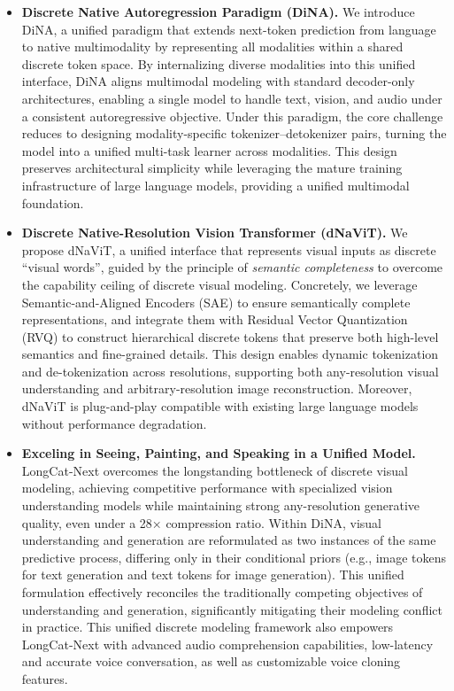 \documentclass{article}
\begin{document}
\begin{itemize}
\item 
\textbf{Discrete Native Autoregression Paradigm (DiNA).} 
We introduce DiNA, a unified paradigm that extends next-token prediction from language to native multimodality by representing all modalities within a shared discrete token space. By internalizing diverse modalities into this unified interface, DiNA aligns multimodal modeling with standard decoder-only architectures, enabling a single model to handle text, vision, and audio under a consistent autoregressive objective. Under this paradigm, the core challenge reduces to designing modality-specific tokenizer–detokenizer pairs, turning the model into a unified multi-task learner across modalities. This design preserves architectural simplicity while leveraging the mature training infrastructure of large language models, providing a unified multimodal foundation.
\item
\textbf{Discrete Native-Resolution Vision Transformer (dNaViT).} 
We propose dNaViT, a unified interface that represents visual inputs as discrete ``visual words'', guided by the principle of \emph{semantic completeness} to overcome the capability ceiling of discrete visual modeling. Concretely, we leverage Semantic-and-Aligned Encoders (SAE) to ensure semantically complete representations, and integrate them with Residual Vector Quantization (RVQ) to construct hierarchical discrete tokens that preserve both high-level semantics and fine-grained details. This design enables dynamic tokenization and de-tokenization across resolutions, supporting both any-resolution visual understanding and arbitrary-resolution image reconstruction. Moreover, dNaViT is plug-and-play compatible with existing large language models without performance degradation.

\item
\textbf{Exceling in Seeing, Painting, and Speaking in a Unified Model.}
LongCat-Next overcomes the longstanding bottleneck of discrete visual modeling, achieving competitive performance with specialized vision understanding models while maintaining strong any-resolution generative quality, even under a 28× compression ratio.
Within DiNA, visual understanding and generation are reformulated as two instances of the same predictive process, differing only in their conditional priors (e.g., image tokens for text generation and text tokens for image generation). This unified formulation effectively reconciles the traditionally competing objectives of understanding and generation, significantly mitigating their modeling conflict in practice.
This unified discrete modeling framework also empowers LongCat-Next with advanced audio comprehension capabilities, low-latency and accurate voice conversation, as well as customizable voice cloning features.


\end{itemize}
\end{document}
